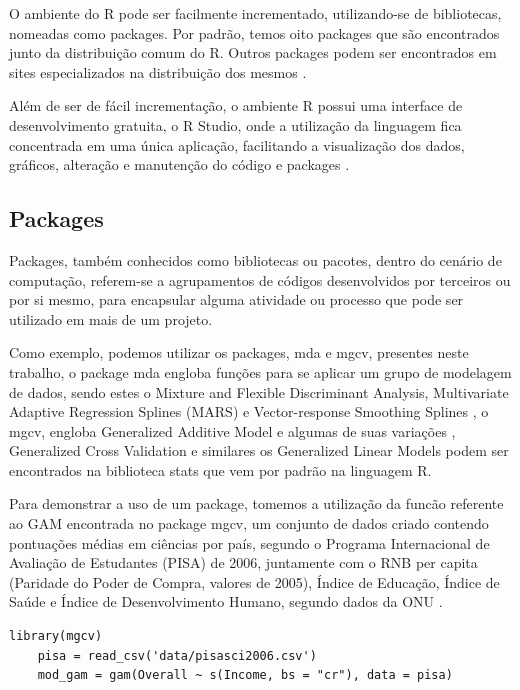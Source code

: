 \documentclass[
	12pt,				%
	openright,			%
	oneside,			%
	a4paper,			%
	english,			%
	brazil				%
	]{abntex2}
\begin{document}
O ambiente do R pode ser facilmente incrementado, utilizando-se de bibliotecas, nomeadas como packages. Por padrão, temos oito packages 
que são encontrados junto da distribuição comum do R. Outros packages podem ser encontrados em sites especializados na distribuição dos 
mesmos \cite{ling_r}.

Além de ser de fácil incrementação, o ambiente R possui uma interface de desenvolvimento gratuita, o R Studio, onde a utilização da 
linguagem fica concentrada em uma única aplicação, facilitando a visualização dos dados, gráficos, alteração e manutenção do código e 
packages \cite{rstudio}.

\subsection{Packages}

Packages, também conhecidos como bibliotecas ou pacotes, dentro do cenário de computação, referem-se a agrupamentos de códigos 
desenvolvidos por terceiros ou por si mesmo, para encapsular alguma atividade ou processo que pode ser utilizado em mais de um projeto.

Como exemplo, podemos utilizar os packages, mda e mgcv, presentes neste trabalho, o package mda engloba funções para se aplicar
um grupo de modelagem de dados, sendo estes o Mixture and Flexible Discriminant Analysis, Multivariate Adaptive Regression 
Splines (MARS) e Vector-response Smoothing Splines \cite{mda}, o mgcv, engloba Generalized Additive Model e algumas de suas variações
, Generalized Cross Validation e similares \cite{mgcv} os Generalized Linear Models podem ser encontrados na biblioteca stats que
vem por padrão na linguagem R.

Para demonstrar a uso de um package, tomemos a utilização da funcão referente ao GAM encontrada no package mgcv, um conjunto de dados
criado contendo pontuações médias em ciências por país, segundo o Programa Internacional de Avaliação de Estudantes (PISA) de 2006,
juntamente com o RNB per capita (Paridade do Poder de Compra, valores de 2005), Índice de Educação, Índice de Saúde e 
Índice de Desenvolvimento Humano, segundo dados da ONU \cite{gam_exemplo}.

\lstset{style=r_code}
\begin{lstlisting}[caption={\label{Exemplo uso de package}Exemplo uso de package}]
	library(mgcv)
	pisa = read_csv('data/pisasci2006.csv')
	mod_gam = gam(Overall ~ s(Income, bs = "cr"), data = pisa)
\end{lstlisting}
\end{document}

